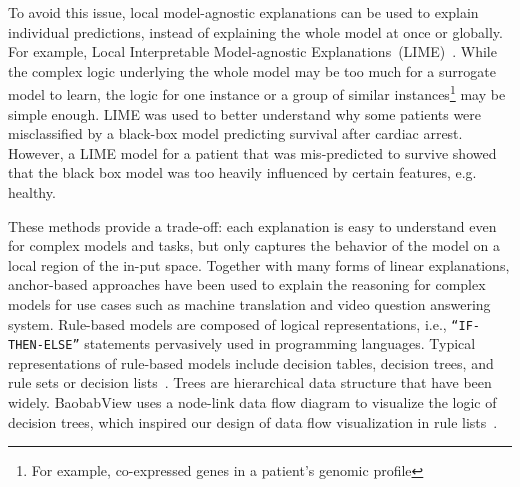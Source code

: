 \hspace*{3.5mm} To avoid this issue, local model-agnostic explanations can be used to explain individual predictions, instead of explaining the whole model at once or globally. For example, Local Interpretable Model-agnostic Explanations~(LIME)~\cite{LIME}. While the complex logic underlying the whole model may be too much for a surrogate model to learn, the logic for one instance or a group of similar instances\footnote{For example, co-expressed genes in a patient's genomic profile} may be simple enough. LIME was used to better understand why some patients were misclassified by a black-box model predicting survival after cardiac arrest. However, a LIME model for a patient that was mis-predicted to survive showed that the black box model was too heavily influenced by certain features, e.g. healthy. 

\hspace*{3.5mm} These methods provide a trade-off: each explanation is easy to understand even for complex models and tasks, but only captures the behavior of the model on a local region of the in-put space. Together with many forms of linear explanations, anchor-based approaches have been used to explain the reasoning for complex models for use cases such as machine translation and video question answering system. Rule-based models are composed of logical representations, i.e., \texttt{``IF-THEN-ELSE''} statements pervasively used in programming languages. Typical representations of rule-based models include decision tables, decision trees, and rule sets or decision lists~\cite{BayesianRule}. Trees are hierarchical data structure that have been widely. BaobabView uses a node-link data flow diagram to visualize the logic of decision trees, which inspired our design of data flow visualization in rule lists~\cite{ming2018rulematrix}. 


